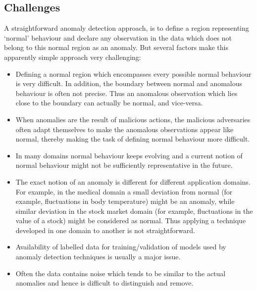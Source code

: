 \subsection{Challenges}
\label{anomalyDetection:challenges}
A straightforward anomaly detection approach, is to define a region representing
`normal' behaviour and declare any observation in the data which does not belong
to this normal region as an anomaly. But several factors make this apparently
simple approach very challenging:

\begin{itemize}

\item Defining a normal region which encompasses every possible normal behaviour
is very difficult. In addition, the boundary between normal and anomalous
behaviour is often not precise. Thus an anomalous observation which lies close
to the boundary can actually be normal, and vice-versa.

\item When anomalies are the result of malicious actions, the malicious
adversaries often adapt themselves to make the anomalous observations appear
like normal, thereby making the task of defining normal behaviour more
difficult.

\item In many domains normal behaviour keeps evolving and a current notion of
normal behaviour might not be sufficiently representative in the future.

\item The exact notion of an anomaly is different for different application
domains. For example, in the medical domain a small deviation from normal (for
example, fluctuations in body temperature) might be an anomaly, while similar
deviation in the stock market domain (for example, fluctuations in the value of
a stock) might be considered as normal. Thus applying a technique developed in
one domain to another is not straightforward.

\item Availability of labelled data for training/validation of models used by
anomaly detection techniques is usually a major issue.

\item Often the data contains noise which tends to be similar to the actual
anomalies and hence is difficult to distinguish and remove.

\end{itemize}

